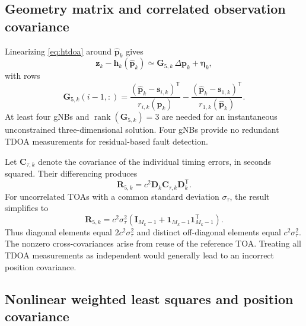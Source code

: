 \documentclass[pdflatex,sn-mathphys-num]{sn-jnl}
\newcommand{\vect}[1]{\boldsymbol{#1}}
\newcommand{\mat}[1]{\mathbf{#1}}
\newcommand{\trans}{^{\mathsf T}}
\begin{document}
\subsection{Geometry matrix and correlated observation covariance}

Linearizing \eqref{eq:htdoa} around $\hat{\vect{p}}_k$ gives
\begin{equation}\label{eq:linear5g}
 \vect{z}_k-\vect{h}_k(\hat{\vect{p}}_k)
 \simeq\mat{G}_{5,k}\,\Delta\vect{p}_k+\vect{\eta}_k,
\end{equation}
with rows
\begin{equation}\label{eq:G5g}
 \mat{G}_{5,k}(i-1,:)=
 \frac{(\hat{\vect{p}}_k-\vect{s}_{i,k})\trans}
 {r_{i,k}(\hat{\vect{p}}_k)}-
 \frac{(\hat{\vect{p}}_k-\vect{s}_{1,k})\trans}
 {r_{1,k}(\hat{\vect{p}}_k)}.
\end{equation}
At least four gNBs and
$\operatorname{rank}(\mat{G}_{5,k})=3$ are needed for an
instantaneous unconstrained three-dimensional solution. Four gNBs
provide no redundant TDOA measurements for residual-based fault detection.

Let $\mat{C}_{\tau,k}$ denote the covariance of the individual timing
errors, in seconds squared. Their differencing produces
\begin{equation}\label{eq:R5g}
 \boxed{\mat{R}_{5,k}=c^2\mat{D}_k\mat{C}_{\tau,k}
 \mat{D}_k\trans}.
\end{equation}
For uncorrelated TOAs with a common standard deviation
$\sigma_\tau$, the result simplifies to
\begin{equation}\label{eq:R5gsimple}
 \mat{R}_{5,k}=c^2\sigma_\tau^2
 \left(\mat{I}_{M_k-1}+\vect{1}_{M_k-1}\vect{1}_{M_k-1}\trans\right).
\end{equation}
Thus diagonal elements equal $2c^2\sigma_\tau^2$ and distinct off-diagonal
elements equal $c^2\sigma_\tau^2$. The nonzero cross-covariances arise
from reuse of the reference TOA. Treating all TDOA measurements as
independent would generally lead to an incorrect position covariance.

\subsection{Nonlinear weighted least squares and position covariance}
\end{document}
